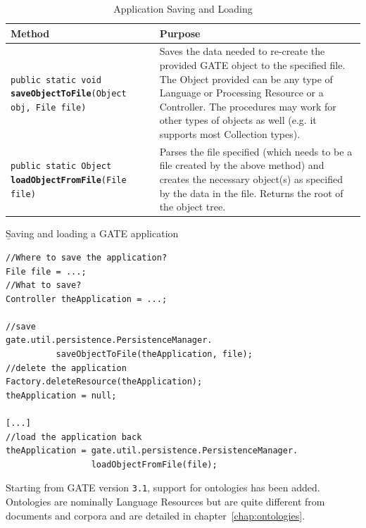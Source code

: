 \begin{table}[htbp]
\begin{small}
\begin{center}
\begin{tabular}{|p{}|p{}|}
\hline
\textbf{Method} & \textbf{Purpose}\\
\hline
{\tt public static void {\bf saveObjectToFile}(Object obj, File file)} & 
Saves the data needed to re-create the provided GATE object to the specified
file. The Object provided can be any type of Language or Processing Resource
or a Controller. The procedures may work for other types of objects as well
(e.g. it supports most Collection types).\\
\hline
{\tt public static Object {\bf loadObjectFromFile}(File file)} & Parses the
file specified (which needs to be a file created by the above method) and
creates the necessary object(s) as specified by the data in the file.
Returns the root of the object tree.\\
\hline
\end{tabular}
\caption{Application Saving and Loading}
\label{table:save-load}
\end{center}
\end{small}
\end{table}


{\b Saving and loading a GATE application}


\begin{lstlisting}
//Where to save the application?
File file = ...;
//What to save?
Controller theApplication = ...;

//save
gate.util.persistence.PersistenceManager.
          saveObjectToFile(theApplication, file);
//delete the application
Factory.deleteResource(theApplication);
theApplication = null;

[...]
//load the application back
theApplication = gate.util.persistence.PersistenceManager.
                 loadObjectFromFile(file);
\end{lstlisting}



Starting from GATE version {\tt 3.1}, support for ontologies has been added.
Ontologies are nominally Language Resources but are quite different from
documents and corpora and are detailed in chapter~\ref{chap:ontologies}.

